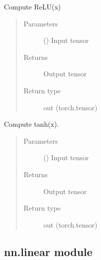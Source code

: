 \documentclass[letterpaper,10pt,english]{sphinxmanual}
\begin{document}

\begin{fulllineitems}
\label{\detokenize{nn:nn.functional.relu}}
Compute ReLU(x)
\begin{quote}\begin{description}
\item[{Parameters}] \leavevmode
{} () \textendash{} Input tensor

\item[{Returns}] \leavevmode
Output tensor

\item[{Return type}] \leavevmode
out (torch.tensor)

\end{description}\end{quote}

\end{fulllineitems}


\begin{fulllineitems}
\label{\detokenize{nn:nn.functional.tanh}}
Compute tanh(x).
\begin{quote}\begin{description}
\item[{Parameters}] \leavevmode
{} () \textendash{} Input tensor

\item[{Returns}] \leavevmode
Output tensor

\item[{Return type}] \leavevmode
out (torch.tensor)

\end{description}\end{quote}

\end{fulllineitems}



\subsection{nn.linear module}
\label{\detokenize{nn:module-nn.linear}}\label{\detokenize{nn:nn-linear-module}}
\end{document}
